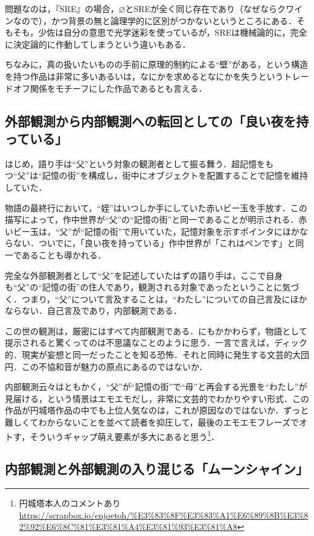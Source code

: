\documentclass[10pt, a5paper, twoside]{jsarticle}
\begin{document}
			問題なのは，『SRE』の場合，$ \varnothing $とSREが全く同じ存在であり（なぜならクワインなので），かつ背景の無と論理学的に区別がつかないというところにある．そもそも，少佐は自分の意思で光学迷彩を使っているが，SREは機械論的に，完全に決定論的に作動してしまうという違いもある．

			ちなみに，真の扱いたいものの手前に原理的制約による“壁”がある，という構造を持つ作品は非常に多いあるいは，なにかを求めるとなにかを失うというトレードオフ関係をモチーフにした作品であるとも言える．

		\subsection{外部観測から内部観測への転回としての「良い夜を持っている」}

			はじめ，語り手は“父”という対象の観測者として振る舞う．超記憶をもつ“父”は“記憶の街”を構成し，街中にオブジェクトを配置することで記憶を維持していた．

			物語の最終行において，“姪”はいつしか手にしていた赤いビー玉を手放す．この描写によって，作中世界が“父”の“記憶の街”と同一であることが明示される．赤いビー玉は，“父”が“記憶の街”で用いていた，記憶対象を示すポインタにほかならない．ついでに，「良い夜を持っている」作中世界が「これはペンです」と同一であることも導かれる．

			完全な外部観測者として“父”を記述していたはずの語り手は，ここで自身も“父”の“記憶の街”の住人であり，観測される対象であったということに気づく．つまり，“父”について言及することは，“わたし”についての自己言及にほかならない．自己言及であり，内部観測である．

			この世の観測は，厳密にはすべて内部観測である．にもかかわらず，物語として提示されると驚くってのは不思議なことのように思う．一言で言えば，ディック的．現実が妄想と同一だったことを知る恐怖．それと同時に発生する文芸的大団円．この不協和音が魅力の原点にあるのではないか．

			内部観測云々はともかく，“父”が“記憶の街”で“母”と再会する光景を“わたし”が見届ける，という情景はエモエモだし，非常に文芸的でわかりやすい形式．この作品が円城塔作品の中でも上位人気なのは，これが原因なのではないか．ずっと難しくてわからないことを並べて読者を抑圧して，最後のエモエモフレーズでオトす，そういうギャップ萌え要素が多大にあると思う\footnote{円城塔本人のコメントあり \\ \url{https://scrapbox.io/enjoetoh/%E3%83%8F%E3%83%A1%E6%89%8B%E3%82%92%E6%8C%81%E3%81%A4%E3%81%93%E3%81%A8}}．

		\subsection{内部観測と外部観測の入り混じる「ムーンシャイン」}
\end{document}
